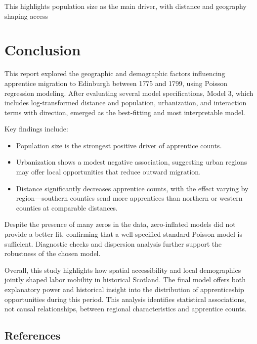 \documentclass[
  12pt,
]{article}
\begin{document}
This highlights population size as the main driver, with distance and
geography shaping access

\section{Conclusion}\label{conclusion-1}

This report explored the geographic and demographic factors influencing
apprentice migration to Edinburgh between 1775 and 1799, using Poisson
regression modeling. After evaluating several model specifications,
Model 3, which includes log-transformed distance and population,
urbanization, and interaction terms with direction, emerged as the
best-fitting and most interpretable model.

Key findings include:

\begin{itemize}
\item
  Population size is the strongest positive driver of apprentice counts.
\item
  Urbanization shows a modest negative association, suggesting urban
  regions may offer local opportunities that reduce outward migration.
\item
  Distance significantly decreases apprentice counts, with the effect
  varying by region---southern counties send more apprentices than
  northern or western counties at comparable distances.
\end{itemize}

Despite the presence of many zeros in the data, zero-inflated models did
not provide a better fit, confirming that a well-specified standard
Poisson model is sufficient. Diagnostic checks and dispersion analysis
further support the robustness of the chosen model.

Overall, this study highlights how spatial accessibility and local
demographics jointly shaped labor mobility in historical Scotland. The
final model offers both explanatory power and historical insight into
the distribution of apprenticeship opportunities during this period.
This analysis identifies statistical associations, not causal
relationships, between regional characteristics and apprentice counts.

\subsection{References}\label{references}
\end{document}
